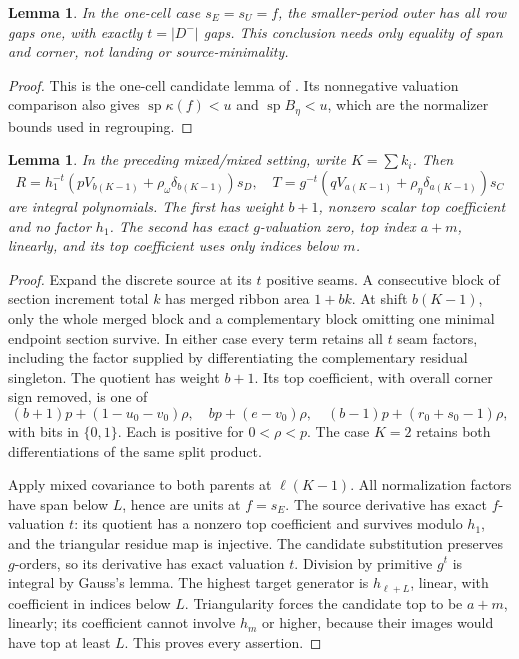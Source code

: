 \documentclass[11pt,a4paper]{amsart}
\numberwithin{equation}{section}
\theoremstyle{plain}
\newtheorem{lemma}[theorem]{Lemma}
\theoremstyle{definition}
\begin{document}
\begin{lemma}\label{lem:alpha-row-candidate}
In the one-cell case \(s_E=s_U=f\), the smaller-period outer has all row gaps one, with exactly \(t=|D^-|\) gaps.  This conclusion needs only equality of span and corner, not landing or source-minimality.
\end{lemma}
\begin{proof}
This is the one-cell candidate lemma of \cite{Shields2026CornerDescent}.  Its nonnegative valuation comparison also gives \(\operatorname{sp}\kappa(f)<u\) and \(\operatorname{sp}B_\eta<u\), which are the normalizer bounds used in regrouping.
\end{proof}

\begin{lemma}\label{lem:high-quotients}
In the preceding mixed/mixed setting, write \(K=\sum k_i\).  Then
\[
 R=h_1^{-t}(pV_{b(K-1)}+\rho_\omega\delta_{b(K-1)})s_D,
\quad
 T=g^{-t}(qV_{a(K-1)}+\rho_\eta\delta_{a(K-1)})s_C
\]
are integral polynomials.  The first has weight \(b+1\), nonzero scalar top coefficient and no factor \(h_1\).  The second has exact \(g\)-valuation zero, top index \(a+m\), linearly, and its top coefficient uses only indices below \(m\).
\end{lemma}
\begin{proof}
Expand the discrete source at its \(t\) positive seams.  A consecutive block of section increment total \(k\) has merged ribbon area \(1+bk\).  At shift \(b(K-1)\), only the whole merged block and a complementary block omitting one minimal endpoint section survive.  In either case every term retains all \(t\) seam factors, including the factor supplied by differentiating the complementary residual singleton.  The quotient has weight \(b+1\).  Its top coefficient, with overall corner sign removed, is one of
\[
 (b+1)p+(1-u_0-v_0)\rho,\quad
 bp+(e-v_0)\rho,\quad
 (b-1)p+(r_0+s_0-1)\rho,
\]
with bits in \(\{0,1\}\).  Each is positive for \(0<\rho<p\).  The case \(K=2\) retains both differentiations of the same split product.

Apply mixed covariance to both parents at \(\ell(K-1)\).  All normalization factors have span below \(L\), hence are units at \(f=s_E\).  The source derivative has exact \(f\)-valuation \(t\): its quotient has a nonzero top coefficient and survives modulo \(h_1\), and the triangular residue map is injective.  The candidate substitution preserves \(g\)-orders, so its derivative has exact valuation \(t\).  Division by primitive \(g^t\) is integral by Gauss's lemma.  The highest target generator is \(h_{\ell+L}\), linear, with coefficient in indices below \(L\).  Triangularity forces the candidate top to be \(a+m\), linearly; its coefficient cannot involve \(h_m\) or higher, because their images would have top at least \(L\).  This proves every assertion.
\end{proof}
\end{document}
